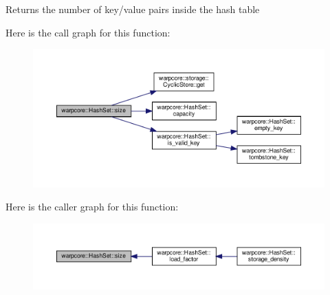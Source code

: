 \begin{DoxyReturn}{Returns}
the number of key/value pairs inside the hash table 
\end{DoxyReturn}
Here is the call graph for this function\+:
\nopagebreak
\begin{figure}[H]
\begin{center}
\leavevmode
\includegraphics[width=350pt]{classwarpcore_1_1HashSet_a7b1967bd8986a3bbebdfca54c461cae6_cgraph}
\end{center}
\end{figure}
Here is the caller graph for this function\+:
\nopagebreak
\begin{figure}[H]
\begin{center}
\leavevmode
\includegraphics[width=350pt]{classwarpcore_1_1HashSet_a7b1967bd8986a3bbebdfca54c461cae6_icgraph}
\end{center}
\end{figure}
\mbox{\label{classwarpcore_1_1HashSet_a11adf7a98c8686f220f2f556a810a211}} 
